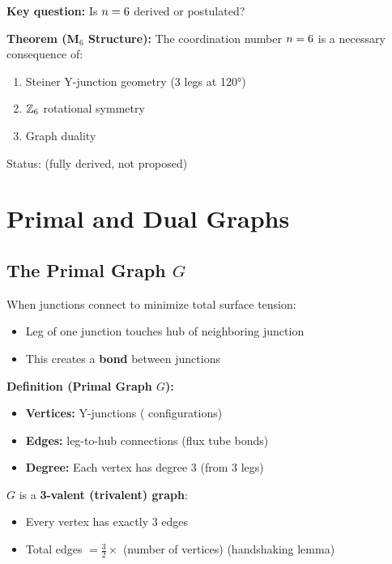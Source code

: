 \textbf{Key question:} Is $n = 6$ derived or postulated?

\begin{derivationbox}[title=Main Theorem]
    \textbf{Theorem (M$_6$ Structure):} The coordination number $n = 6$ is a
    necessary consequence of:
    \begin{enumerate}
        \item Steiner Y-junction geometry (3 legs at 120°)
        \item $\mathbb{Z}_6$ rotational symmetry
        \item Graph duality
    \end{enumerate}
    Status: \tagDer{} (fully derived, not proposed)
\end{derivationbox}

\section{Primal and Dual Graphs}
\label{sec:M6:primal_dual}

\subsection{The Primal Graph $G$}

When junctions connect to minimize total surface tension:
\begin{itemize}
    \item Leg of one junction touches hub of neighboring junction
    \item This creates a \textbf{bond} between junctions
\end{itemize}

\textbf{Definition (Primal Graph $G$):}
\begin{itemize}
    \item \textbf{Vertices:} Y-junctions (\Junction{} configurations)
    \item \textbf{Edges:} leg-to-hub connections (flux tube bonds)
    \item \textbf{Degree:} Each vertex has degree 3 (from 3 legs)
\end{itemize}

\begin{derivationbox}[title=Primal Graph Properties]
    $G$ is a \textbf{3-valent (trivalent) graph}: \tagDc
    \begin{itemize}
        \item Every vertex has exactly 3 edges
        \item Total edges $= \frac{3}{2} \times$ (number of vertices) (handshaking lemma)
    \end{itemize}
\end{derivationbox}

